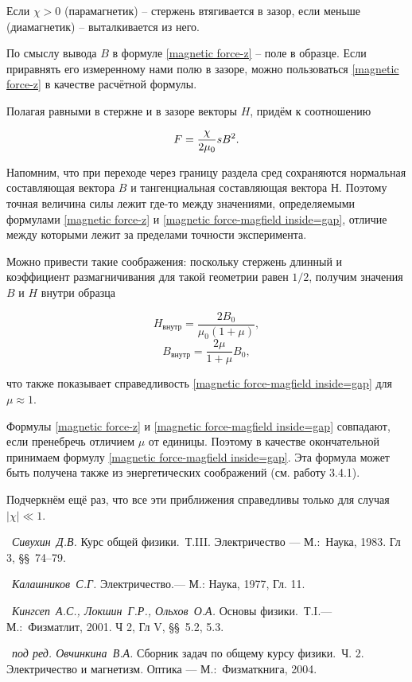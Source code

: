 Если $\chi > 0$ (парамагнетик) -- стержень втягивается в зазор, если меньше (диамагнетик) -- выталкивается из него.

По смыслу вывода $B$ в формуле \eqref{magnetic force-z} -- поле в образце. Если приравнять его измеренному нами полю в зазоре, можно пользоваться \eqref{magnetic force-z} в качестве расчётной формулы.

Полагая равными в стержне и в зазоре векторы $H$, придём к соотношению

\begin{equation}
	\eqmark[magnetic force-magfield inside=gap]
	F = \frac{\chi}{2\mu_0} sB^2.
\end{equation}

Напомним, что при переходе через границу раздела сред сохраняются нормальная составляющая вектора $B$ и тангенциальная составляющая вектора $Н$. Поэтому точная величина силы лежит где-то между значениями, определяемыми формулами \eqref{magnetic force-z} и \eqref{magnetic force-magfield inside=gap}, отличие между которыми лежит за пределами точности эксперимента.

Можно привести такие соображения: поскольку стержень длинный и коэффициент размагничивания для такой геометрии равен $1/2$,  получим значения $B$ и $H$ внутри образца

\begin{equation*}
	H_{\text{внутр}} = \frac{2B_0}{\mu_0 (1 + \mu)},
\end{equation*}
\begin{equation*}
	B_{\text{внутр}} = \frac{2\mu}{1 + \mu} B_0,
\end{equation*}

что также показывает справедливость \eqref{magnetic force-magfield inside=gap} для $\mu \approx 1$.

Формулы \eqref{magnetic force-z} и \eqref{magnetic force-magfield inside=gap} совпадают, если пренебречь отличием $\mu$ от единицы. Поэтому в качестве окончательной принимаем формулу \eqref{magnetic force-magfield inside=gap}. Эта формула может быть получена также из энергетических соображений (см. работу 3.4.1).

Подчеркнём ещё раз, что все эти приближения справедливы только для случая $|\chi| \ll 1$.

\begin{lab:literature}
	\item~\emph{Сивухин~Д.В.} Курс общей физики.~Т.III. Электричество --- М.:~Наука, 1983. Гл 3, \S\S~74--79.
	\item~\emph{Калашников~С.Г.} Электричество.--- М.: Наука, 1977, Гл. 11.
	\item~\emph{Кингсеп~А.С., Локшин~Г.Р., Ольхов~О.А.} Основы физики.~Т.I.--- М.:~Физматлит, 2001. Ч 2, Гл V, \S\S~5.2, 5.3.
	\item~\emph{под ред. Овчинкина~В.А.} Сборник задач по общему курсу физики.~Ч. 2. Электричество и магнетизм. Оптика --- М.:~Физматкнига, 2004.
\end{lab:literature}

